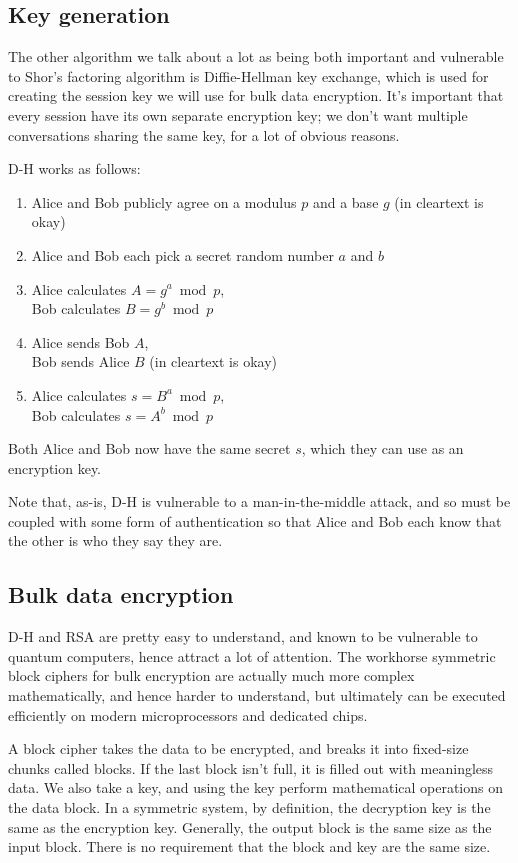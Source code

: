 \documentclass[%
 aip,
 jmp,%
 amsmath,amssymb,
 reprint,%
]{revtex4-1}
\begin{document}
\subsection{Key generation}

The other algorithm we talk about a lot as being both important and
vulnerable to Shor's factoring algorithm is Diffie-Hellman key
exchange, which is used for creating the session key we will use for
bulk data encryption.  It's important that every session have its own
separate encryption key; we don't want multiple conversations sharing
the same key, for a lot of obvious reasons.

D-H works as follows:

\begin{enumerate}
  \item Alice and Bob publicly agree on a modulus $p$ and a base $g$ (in cleartext is okay)
  \item Alice and Bob each pick a secret random number $a$ and $b$
  \item Alice calculates $A = g^a \bmod p$, \\
    Bob calculates $B = g^b \bmod p$
  \item Alice sends Bob $A$, \\
Bob sends Alice $B$ (in cleartext is okay)
  \item Alice calculates $s = B^a \bmod p$, \\
	   Bob calculates $s = A^b \bmod p$
\end{enumerate}

Both Alice and Bob now have the same secret $s$, which they can use as
an encryption key.

Note that, as-is, D-H is vulnerable to a man-in-the-middle attack, and
so must be coupled with some form of authentication so that Alice and
Bob each know that the other is who they say they are.

\subsection{Bulk data encryption}

D-H and RSA are pretty easy to understand, and known to be vulnerable
to quantum computers, hence attract a lot of attention. The workhorse
symmetric block ciphers for bulk encryption are actually much more
complex mathematically, and hence harder to understand, but ultimately
can be executed efficiently on modern microprocessors and dedicated
chips.

A block cipher takes the data to be encrypted, and breaks it into
fixed-size chunks called blocks.  If the last block isn't full, it is
filled out with meaningless data.  We also take a key, and using the
key perform mathematical operations on the data block.  In a symmetric
system, by definition, the decryption key is the same as the
encryption key.  Generally, the output block is the same size as the
input block.  There is no requirement that the block and key are the
same size.
\end{document}
